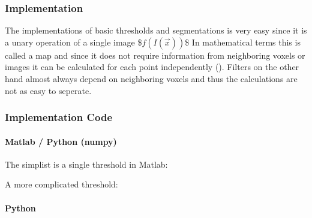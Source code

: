 \documentclass[letterpaper,10pt,english]{sphinxmanual}
\begin{document}
\noindent{}


\subsubsection{Implementation}
\label{\detokenize{04-BasicSegmentation_Part2:implementation}}
\sphinxAtStartPar
The implementations of basic thresholds and segmentations is very easy since it is a unary operation of a single image
\$\( f(I(\vec{x})) \)\$
In mathematical terms this is called a map and since it does not require information from neighboring voxels or images it can be calculated for each point independently (). Filters on the other hand almost always depend on neighboring voxels and thus the calculations are not as easy to seperate.


\subsubsection{Implementation Code}
\label{\detokenize{04-BasicSegmentation_Part2:implementation-code}}

\paragraph{Matlab / Python (numpy)}
\label{\detokenize{04-BasicSegmentation_Part2:matlab-python-numpy}}
\sphinxAtStartPar
The simplist is a single threshold in Matlab:

\begin{sphinxVerbatim}[commandchars=\\\{\}]
\end{sphinxVerbatim}

\sphinxAtStartPar
A more complicated threshold:

\begin{sphinxVerbatim}[commandchars=\\\{\}]
        
\end{sphinxVerbatim}


\paragraph{Python}
\label{\detokenize{04-BasicSegmentation_Part2:python}}
\begin{sphinxVerbatim}[commandchars=\\\{\}]
    
\end{sphinxVerbatim}
\end{document}
